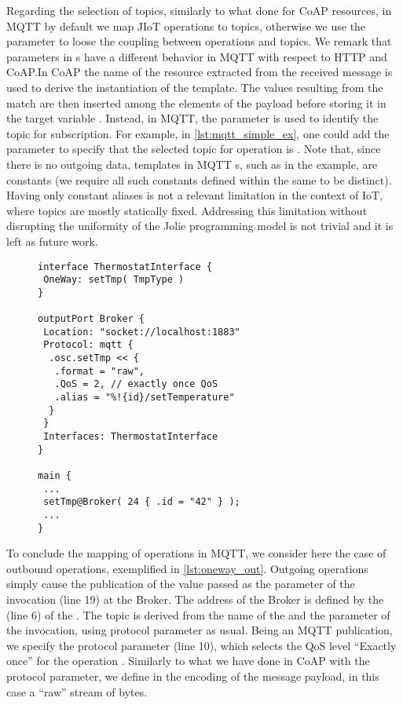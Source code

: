 Regarding the selection of topics, similarly to what done for CoAP resources, in
MQTT by default we map JIoT operations to topics, otherwise we use the
 parameter  to loose the coupling between operations and
topics. We remark that  parameters in s have a
different behavior in MQTT with respect to HTTP and CoAP.\@ In CoAP the name of
the resource extracted from the received message is used to derive the
instantiation of the  template. The values resulting from the match
are then inserted among the elements of the payload before storing it in the
target variable . Instead, in MQTT, the  parameter is
used to identify the topic for subscription. For example, in
\cref{lst:mqtt_simple_ex}, one could add the  parameter
 to specify that the
selected topic for operation  is .
Note that, since there is no outgoing data, templates in MQTT s,
such as  in the example, are constants (we require all such
constants defined within the same  to be distinct). Having only
constant aliases is not a relevant limitation in the context of IoT, where
topics are mostly statically fixed. Addressing this limitation without
disrupting the uniformity of the Jolie programming model is not trivial and it
is left as future work.


\begin{figure}[t]
 \begin{lstlisting}[basicstyle=\footnotesize\ttfamily,caption={Example of
outgoing MQTT \code{OneWay} communication.},label=lst:oneway_out]
interface ThermostatInterface {
 OneWay: setTmp( TmpType )
}

outputPort Broker {
 Location: "socket://localhost:1883"
 Protocol: mqtt {
  .osc.setTmp << {
   .format = "raw",
   .QoS = 2, // exactly once QoS
   .alias = "%!{id}/setTemperature"
  }
 }
 Interfaces: ThermostatInterface
}

main {
 ...
 setTmp@Broker( 24 { .id = "42" } );
 ...
}
\end{lstlisting}
\end{figure}

To conclude the mapping of  operations in MQTT, we consider here
the case of outbound operations, exemplified in \cref{lst:oneway_out}.
%
Outgoing  operations simply cause the publication of the value
passed as the parameter of the invocation (line 19) at the Broker. The address
of the Broker is defined by the  (line 6) of the
 . The topic is derived from the name of the
 and the parameter of the invocation, using protocol parameter
 as usual. Being an MQTT publication, we specify the 
protocol parameter (line 10), which selects the QoS level ``Exactly once'' for
the operation . Similarly to what we have done in CoAP
with the
 protocol parameter,
we define in  the
encoding of the message payload, in this case a ``raw'' stream of bytes.


